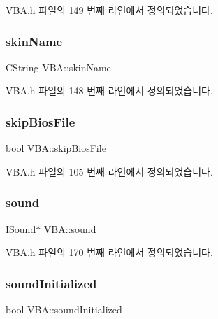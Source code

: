 V\+B\+A.\+h 파일의 149 번째 라인에서 정의되었습니다.

\mbox{\label{class_v_b_a_a61c4b5378e8a3a36cf65bf095cca7f47}} 
\subsubsection{\texorpdfstring{skin\+Name}{skinName}}
{\footnotesize\ttfamily C\+String V\+B\+A\+::skin\+Name}



V\+B\+A.\+h 파일의 148 번째 라인에서 정의되었습니다.

\mbox{\label{class_v_b_a_a5cb340a521f9f53bf082a63b26fbda25}} 
\subsubsection{\texorpdfstring{skip\+Bios\+File}{skipBiosFile}}
{\footnotesize\ttfamily bool V\+B\+A\+::skip\+Bios\+File}



V\+B\+A.\+h 파일의 105 번째 라인에서 정의되었습니다.

\mbox{\label{class_v_b_a_ac6befecbeb59eb76556d3d7490e0452c}} 
\subsubsection{\texorpdfstring{sound}{sound}}
{\footnotesize\ttfamily \mbox{\hyperlink{class_i_sound}{I\+Sound}}$\ast$ V\+B\+A\+::sound}



V\+B\+A.\+h 파일의 170 번째 라인에서 정의되었습니다.

\mbox{\label{class_v_b_a_ab183a69bf3da1ebd78a3dc115071e592}} 
\subsubsection{\texorpdfstring{sound\+Initialized}{soundInitialized}}
{\footnotesize\ttfamily bool V\+B\+A\+::sound\+Initialized}



